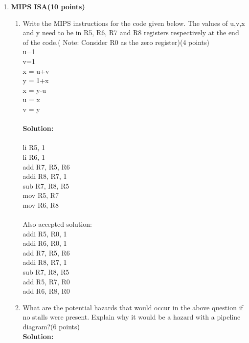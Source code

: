 \documentclass[a4paper,10pt]{article}
\begin{document}
\begin{enumerate}
\item \textbf{MIPS ISA(10 points)}
\begin{enumerate}
    \item Write the MIPS instructions for the code given below. The values of u,v,x and y need to be in R5, R6, R7 and R8 registers respectively at the end of the code.( Note: Consider R0 as the zero register)(4 points)\\
        u=1 \\
        v=1\\
        x = u+v\\
        y = 1+x\\
        x = y-u\\
        u = x \\
        v = y \\
        \\
              \textbf{Solution:}\\
        \\
        li R5, 1\\
        li R6, 1\\
        add R7, R5, R6\\
        addi R8, R7, 1\\
        sub R7, R8, R5\\
        mov R5, R7\\
        mov R6, R8\\ \\
    Also accepted solution:\\
        addi R5, R0, 1\\
        addi R6, R0, 1\\
        add R7, R5, R6\\
        addi R8, R7, 1\\
        sub R7, R8, R5\\
        add R5, R7, R0\\
        add R6, R8, R0\\
    \item What are the potential hazards that would occur in the above question if no stalls were present. Explain why it would be a hazard with a pipeline diagram?(6 points)\\   
    \textbf{Solution:}
  

\end{enumerate}
\end{enumerate}
\end{document}
